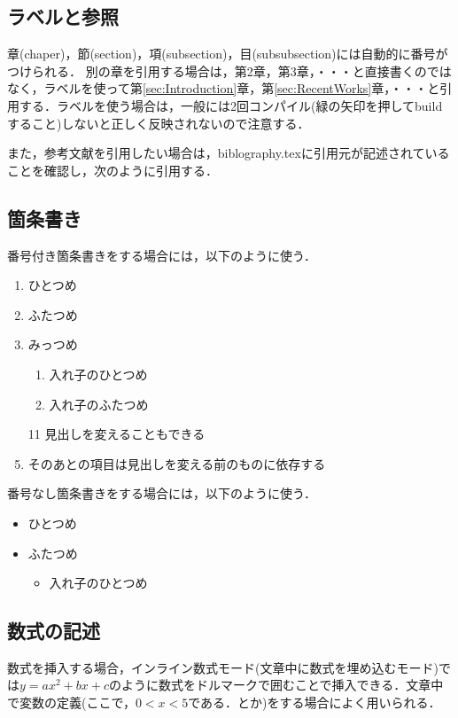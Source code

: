 \subsection{ラベルと参照}\label{sec:ラベル}
章(chaper)，節(section)，項(subsection)，目(subsubsection)には自動的に番号がつけられる．
別の章を引用する場合は，第2章，第3章，・・・と直接書くのではなく，ラベルを使って第\ref{sec:Introduction}章，第\ref{sec:RecentWorks}章，・・・と引用する．ラベルを使う場合は，一般には2回コンパイル(緑の矢印を押してbuildすること)しないと正しく反映されないので注意する．

また，参考文献を引用したい場合は，biblography.texに引用元が記述されていることを確認し，次\cite{Krizhevsky_2012}のように引用する．

\subsection{箇条書き}\label{sec:箇条書き}
番号付き箇条書きをする場合には，以下のように使う．
\begin{enumerate}
    \item ひとつめ
    \item ふたつめ
    \item みっつめ
    \begin{enumerate}
        \item 入れ子のひとつめ
        \item 入れ子のふたつめ
    \end{enumerate}
    \item[11] 見出しを変えることもできる 
    \item そのあとの項目は見出しを変える前のものに依存する
\end{enumerate}

番号なし箇条書きをする場合には，以下のように使う．
\begin{itemize}
    \item ひとつめ
    \item ふたつめ
    \begin{itemize}
        \item 入れ子のひとつめ
    \end{itemize}
\end{itemize}

\subsection{数式の記述}\label{sec:数式}
数式を挿入する場合，インライン数式モード(文章中に数式を埋め込むモード)では$y=ax^{2}+bx+c$のように数式をドルマークで囲むことで挿入できる．文章中で変数の定義(ここで，$0<x<5$である．とか)をする場合によく用いられる．

